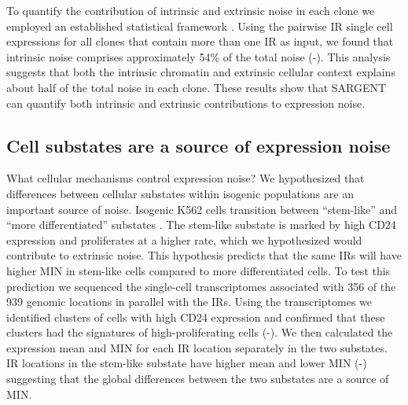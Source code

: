 To quantify the contribution of intrinsic and extrinsic noise in each clone we employed an established statistical framework \cite{fuaq_pachterl:EstimatingIntrinsic2016}. Using the pairwise IR single cell expressions for all clones that contain more than one IR as input, we found that intrinsic noise comprises approximately 54\% of the total noise (-). This analysis suggests that both the intrinsic chromatin and extrinsic cellular context explains about half of the total noise in each clone. These results show that SARGENT can quantify both intrinsic and extrinsic contributions to expression noise.

\subsection{Cell substates are a source of expression noise}

What cellular mechanisms control expression noise? We hypothesized that differences between cellular substates within isogenic populations are an important source of noise. Isogenic K562 cells transition between \enquote{stem-like} and \enquote{more differentiated} substates \cite{litzenburgerum_changhy:SinglecellEpigenomic2017, moudgila_mitrard:SelfReportingTransposons2020}. The stem-like substate is marked by high CD24 expression and proliferates at a higher rate, which we hypothesized would contribute to extrinsic noise. This hypothesis predicts that the same IRs will have higher MIN in stem-like cells compared to more differentiated cells. To test this prediction we sequenced the single-cell transcriptomes associated with 356 of the 939 genomic locations in parallel with the IRs. Using the transcriptomes we identified clusters of cells with high CD24 expression and confirmed that these clusters had the signatures of high-proliferating cells (-). We then calculated the expression mean and MIN for each IR location separately in the two substates. IR locations in the stem-like substate have higher mean and lower MIN (-) suggesting that the global differences between the two substates are a source of MIN. 

